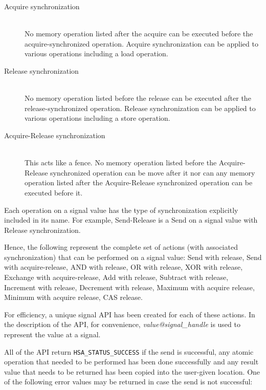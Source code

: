 \begin{description}
        \item[Acquire synchronization] \hfill \\ 
                No memory operation listed after the acquire can be
                executed before the acquire-synchronized operation. Acquire
                synchronization can be applied to various operations
                including a load operation.
        \item[Release synchronization] \hfill \\ 
                No memory operation listed before the release can be
                executed after the release-synchronized operation. Release
                synchronization can be applied to various operations
                including a store operation.
        \item[Acquire-Release synchronization] \hfill \\
                This acts like a fence. No memory operation listed
                before the Acquire-Release synchronized operation
                can be move after it nor can any memory operation
                listed after the Acquire-Release synchronized
                operation can be executed before it.
\end{description}
                
Each operation on a signal value has the type
of synchronization explicitly included in its name. For example,
Send-Release is a Send on a signal value with Release
synchronization.

Hence, the following represent the complete set of actions (with
associated synchronization) that can be performed on a signal value:
Send with release, 
Send with acquire-release,
AND with release,
OR with release,
XOR with release,
Exchange with acquire-release,
Add with release,
Subtract with release,
Increment with release,
Decrement with release,
Maximum with acquire release,
Minimum with acquire release,
CAS release.

For efficiency, a unique signal API has been created for each of
these actions. In the description of the API, for convenience, 
\emph{value@signal\_handle} is used to represent the value at a
signal. 



All of the  API return
\texttt{HSA\_STATUS\_SUCCESS} if the send is successful, any atomic
operation that needed to be performed has been done successfully and
any result value that needs to be returned has been copied into the
user-given location. One of the following error values may be
returned in case the send is not successful:

